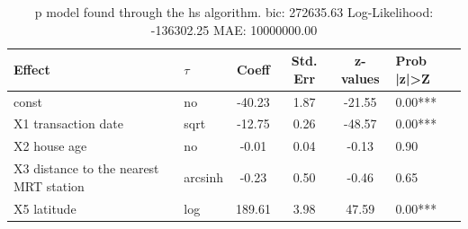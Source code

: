 \begin{table}
	\caption{p model found through the hs algorithm. bic: 272635.63 Log-Likelihood: -136302.25 MAE: 10000000.00}
	\begin{center}
		\begin{tabular}{|l|l|c|c|c|l|}
			\hline
			Effect & $\tau$ & Coeff & Std. Err & z-values & Prob |z|>Z \\
			\hline
			const & no & -40.23 & 1.87 & -21.55 & 0.00*** \\
			\hline
			X1 transaction date & sqrt & -12.75 & 0.26 & -48.57 & 0.00*** \\
			\hline
			X2 house age & no & -0.01 & 0.04 & -0.13 & 0.90 \\
			\hline
			X3 distance to the nearest MRT station & arcsinh & -0.23 & 0.50 & -0.46 & 0.65 \\
			\hline
			X5 latitude & log & 189.61 & 3.98 & 47.59 & 0.00*** \\
			\hline
		\end{tabular}
	\end{center}
\end{table}